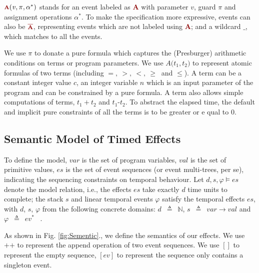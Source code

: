 \documentclass[acmsmall,10pt,review]{acmart}
\newcommand{\anyevent}[1]{{\textcolor{darkred}
{{\textbf{\footnotesize #1}}}}}
\newcommand{\anynotevent}[1]{{\textcolor{darkred}
{{\textbf{\footnotesize $\overline{\text{#1}}$}}}}}
\newcommand{\code}[1]{{\tt{\ensuremath{\m{#1}}}}}
\newcommand{\m}{\mathit}
\newcommand{\lappend}{\mathrel{\texttt{++}}}
\def\defeq{\ensuremath{\,\triangleq}}
\newcommand\figref[1]{Fig. \textcolor{black}{\ref{#1}}.}
\begin{document}
{\code{\anyevent{A}(v, \pi, \alpha^*)} stands for an event labeled 
as \anyevent{A} with parameter \code{v}, guard \code{\pi} and assignment operations \code{\alpha^*}. 
To make the specification more expressive, events can also be 
\code{\anynotevent{A}}, representing  events which are not 
labeled using \anyevent{A}; and a wildcard \code{\_}, which matches to all the events.



We use \code{{\pi}} to donate a pure formula which captures the (Presburger) arithmetic conditions on terms or program parameters. 
We use \code{{A(}{t_1, t_2}{)}} to represent atomic formulas of two terms (including $  {=},
   \ {>},
   \ {<},
   \ {\geq}\ $ and $ {\leq} $).
A term can be a constant integer value \code{c}, an integer variable \code{n} which is an input parameter of the program and can be constrained by a pure formula. 
A term also allows simple computations of terms, \code{t_1{+}t_2} and \code{t_1\text{-}t_2}. To abstract the elapsed time, the default and implicit pure constraints of all the terms is to be greater or e
qual to  0. 


\subsection{Semantic Model of Timed Effects}
\label{subsec:Specification_Semantics}


To define the model, 
\code{var} is the set of program variables, 
\code{val} is the set of primitive values, 
\code{es} is the set of event sequences (or event multi-trees, per se), indicating the sequencing constraints on temporal behaviour.
Let \code{d, s, \varphi \models es} denote the model relation, i.e., 
the effects \code{es} take exactly \code{d} time units to complete; 
the stack \code{s} and linear temporal events \code{\varphi} satisfy the 
temporal effects \code{es}, with \code{d}, \code{s}, \code{\varphi} 
from the following concrete domains: \code{d}  {\defeq}\  \code{\mathbb{N}}, 
\code{s}  \defeq\  \code{var {\rightarrow} val } and \code{\varphi}   \defeq\ \code{ev^*} \ .

As shown in \figref{fig:Sementic}, we define the semantics of our effects. 
We use $\lappend$ to represent the append operation of two event sequences. 
We use $[]$ to represent the empty sequence, \code{[ev]} to represent 
the sequence only contains a singleton event. 

}
\end{document}
